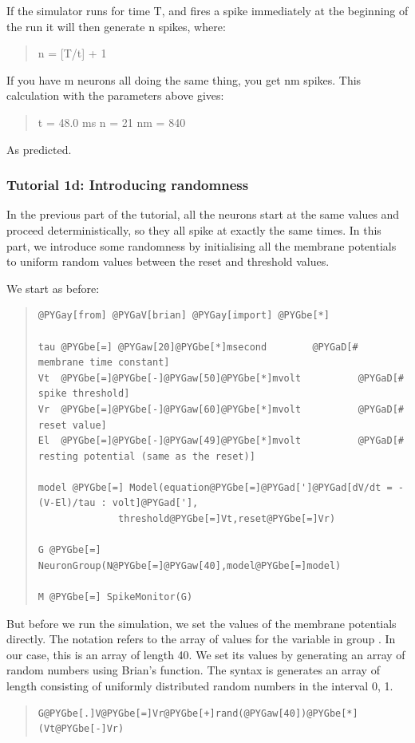 \documentclass[letterpaper,10pt]{manual}
\begin{document}
If the simulator runs for time T, and fires a spike immediately
at the beginning of the run it will then generate n spikes,
where:
\begin{quote}

n = {[}T/t{]} + 1
\end{quote}

If you have m neurons all doing the same thing, you get nm
spikes. This calculation with the parameters above gives:
\begin{quote}

t = 48.0 ms
n = 21
nm = 840
\end{quote}

As predicted.

\resetcurrentobjects


\subsubsection{Tutorial 1d: Introducing randomness}

In the previous part of the tutorial, all the neurons start
at the same values and proceed deterministically, so they all
spike at exactly the same times. In this part, we introduce
some randomness by initialising all the membrane potentials
to uniform random values between the reset and threshold
values.

We start as before:
\begin{quote}

\begin{Verbatim}[commandchars=@\[\]]
@PYGay[from] @PYGaV[brian] @PYGay[import] @PYGbe[*]

tau @PYGbe[=] @PYGaw[20]@PYGbe[*]msecond        @PYGaD[# membrane time constant]
Vt  @PYGbe[=]@PYGbe[-]@PYGaw[50]@PYGbe[*]mvolt          @PYGaD[# spike threshold]
Vr  @PYGbe[=]@PYGbe[-]@PYGaw[60]@PYGbe[*]mvolt          @PYGaD[# reset value]
El  @PYGbe[=]@PYGbe[-]@PYGaw[49]@PYGbe[*]mvolt          @PYGaD[# resting potential (same as the reset)]

model @PYGbe[=] Model(equation@PYGbe[=]@PYGad[']@PYGad[dV/dt = -(V-El)/tau : volt]@PYGad['],
              threshold@PYGbe[=]Vt,reset@PYGbe[=]Vr)

G @PYGbe[=] NeuronGroup(N@PYGbe[=]@PYGaw[40],model@PYGbe[=]model)

M @PYGbe[=] SpikeMonitor(G)
\end{Verbatim}
\end{quote}

But before we run the simulation, we set the values of the
membrane potentials directly. The notation  refers
to the array of values for the variable  in group . In
our case, this is an array of length 40. We set its values
by generating an array of random numbers using Brian's
 function. The syntax is  generates an
array of length  consisting of uniformly distributed
random numbers in the interval 0, 1.
\begin{quote}

\begin{Verbatim}[commandchars=@\[\]]
G@PYGbe[.]V@PYGbe[=]Vr@PYGbe[+]rand(@PYGaw[40])@PYGbe[*](Vt@PYGbe[-]Vr)
\end{Verbatim}
\end{quote}
\end{document}
